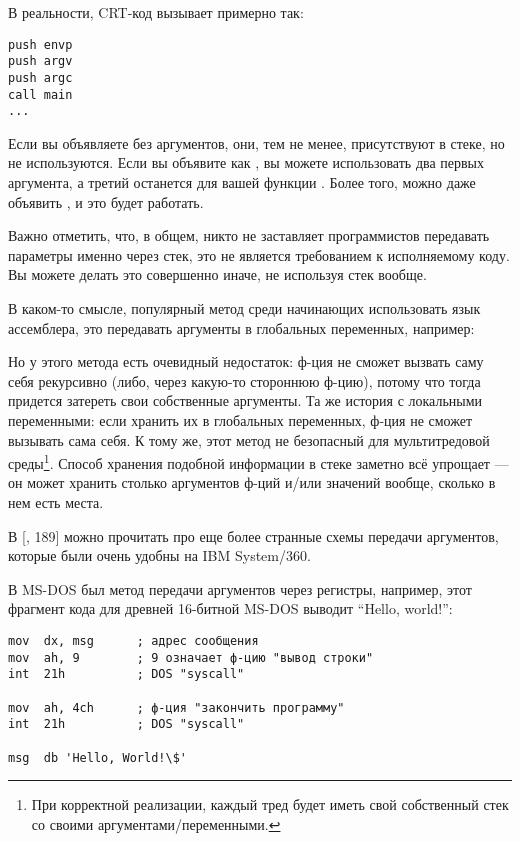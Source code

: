 В реальности, \ac{CRT}-код вызывает \main примерно так:
	
\begin{lstlisting}
push envp
push argv
push argc
call main
...
\end{lstlisting}

Если вы объявляете \main без аргументов, они, тем не менее, присутствуют в стеке, но не используются.
Если вы объявите \main как , 
вы можете использовать два первых аргумента, а третий останется для вашей функции .
Более того, можно даже объявить , и это будет работать.


Важно отметить, что, в общем, никто не заставляет программистов передавать параметры именно через стек, это не является требованием к исполняемому коду.
Вы можете делать это совершенно иначе, не используя стек вообще.

В каком-то смысле, популярный метод среди начинающих использовать язык ассемблера,
это передавать аргументы в глобальных переменных, например:



Но у этого метода есть очевидный недостаток: ф-ция  не сможет вызвать саму себя рекурсивно (либо, через
какую-то стороннюю ф-цию),
потому что тогда придется затереть свои собственные аргументы.
Та же история с локальными переменными: если хранить их в глобальных переменных, ф-ция не сможет вызывать сама себя.
К тому же, этот метод не безопасный для мультитредовой среды\footnote{При корректной реализации,
каждый тред будет иметь свой собственный стек со своими аргументами/переменными.}.
Способ хранения подобной информации в стеке заметно всё упрощает ---
он может хранить столько аргументов ф-ций и/или значений вообще,
сколько в нем есть места.

В [\TAOCPvolI{}, 189] можно прочитать про еще более странные схемы передачи аргументов,
которые были очень удобны на IBM System/360.


В MS-DOS был метод передачи аргументов через регистры, например, этот фрагмент кода для древней 16-битной MS-DOS
выводит ``Hello, world!'':

\begin{lstlisting}
mov  dx, msg      ; адрес сообщения
mov  ah, 9        ; 9 означает ф-цию "вывод строки"
int  21h          ; DOS "syscall"

mov  ah, 4ch      ; ф-ция "закончить программу"
int  21h          ; DOS "syscall"

msg  db 'Hello, World!\$'
\end{lstlisting}

